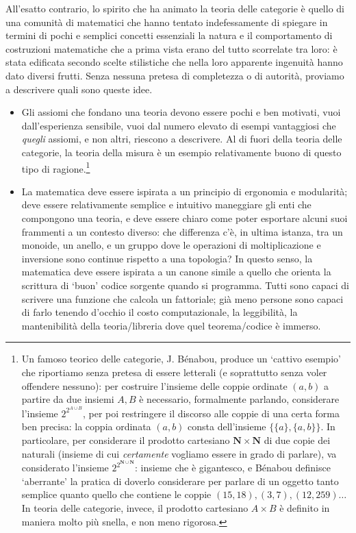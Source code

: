 All'esatto contrario, lo spirito che ha animato la teoria delle categorie è quello di una comunità di matematici che hanno tentato indefessamente di spiegare in termini di pochi e semplici concetti essenziali la natura e il comportamento di costruzioni matematiche che a prima vista erano del tutto scorrelate tra loro: è stata edificata secondo scelte stilistiche che nella loro apparente ingenuità hanno dato diversi frutti. Senza nessuna pretesa di completezza o di autorità, proviamo a descrivere quali sono queste idee.
\begin{itemize}
	\item Gli assiomi che fondano una teoria devono essere pochi e ben motivati, vuoi dall'esperienza sensibile, vuoi dal numero elevato di esempi vantaggiosi che \emph{quegli} assiomi, e non altri, riescono a descrivere. Al di fuori della teoria delle categorie, la teoria della misura è un esempio relativamente buono di questo tipo di ragione.\footnote{Un famoso teorico delle categorie, J. Bénabou, produce un `cattivo esempio' che riportiamo senza pretesa di essere letterali (e soprattutto senza voler offendere nessuno): per costruire l'insieme delle coppie ordinate \((a,b)\) a partire da due insiemi \(A,B\) è necessario, formalmente parlando, considerare l'insieme \(2^{2^{A\cup B}}\), per poi restringere il discorso alle coppie di una certa forma ben precisa: la coppia ordinata \((a,b)\) consta dell'insieme \(\{\{a\},\{a,b\}\}\). In particolare, per considerare il prodotto cartesiano \(\mathbf{N} \times \mathbf{N}\) di due copie dei naturali (insieme di cui \emph{certamente} vogliamo essere in grado di parlare), va considerato l'insieme \(2^{2^{\mathbf{N} \cup \mathbf{N}}}\): insieme che è gigantesco, e Bénabou definisce `aberrante' la pratica di doverlo considerare per parlare di un oggetto tanto semplice quanto quello che contiene le coppie \((15,18), (3,7), (12, 259)\dots\) In teoria delle categorie, invece, il prodotto cartesiano \(A\times B\) è definito in maniera molto più snella, e non meno rigorosa.}
	\item La matematica deve essere ispirata a un principio di ergonomia e modularità; deve essere relativamente semplice e intuitivo maneggiare gli enti che compongono una teoria, e deve essere chiaro come poter esportare alcuni suoi frammenti a un contesto diverso: che differenza c'è, in ultima istanza, tra un monoide, un anello, e un gruppo dove le operazioni di moltiplicazione e inversione sono continue rispetto a una topologia? In questo senso, la matematica deve essere ispirata a un canone simile a quello che orienta la scrittura di `buon' codice sorgente quando si programma. Tutti sono capaci di scrivere una funzione che calcola un fattoriale; già meno persone sono capaci di farlo tenendo d'occhio il costo computazionale, la leggibilità, la mantenibilità della teoria/libreria dove quel teorema/codice è immerso.

\end{itemize}
